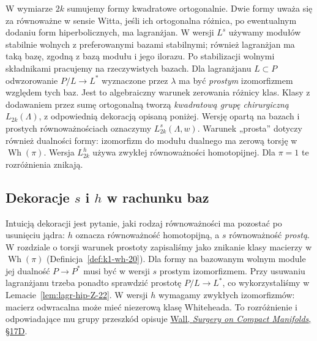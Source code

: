 W wymiarze $2k$ sumujemy formy kwadratowe
ortogonalnie. Dwie formy uważa się za równoważne
w sensie Witta, jeśli ich ortogonalna różnica,
po ewentualnym dodaniu form hiperbolicznych,
ma lagranżjan. W wersji $L^s$ używamy modułów
stabilnie wolnych z preferowanymi bazami stabilnymi;
również lagranżjan ma taką bazę, zgodną z bazą
modułu i jego ilorazu. Po stabilizacji wolnymi
składnikami pracujemy na rzeczywistych bazach.
Dla lagranżjanu
$L\subset P$ odwzorowanie $P/L\to L^*$
wyznaczone przez $\lambda$ ma być \emph{prostym}
izomorfizmem względem tych baz. Jest to algebraiczny warunek
zerowania różnicy klas. Klasy z dodawaniem
przez sumę ortogonalną tworzą \emph{kwadratową grupę
chirurgiczną} $L_{2k}(\Lambda)$, z odpowiednią
dekoracją opisaną poniżej. Wersję opartą na bazach
i prostych równoważnościach oznaczymy
$L^s_{2k}(\Lambda,w)$. Warunek „prosta” dotyczy
również dualności formy: izomorfizm do modułu dualnego
ma zerową torsję w $\operatorname{Wh}(\pi)$.
Wersja $L^h_{2k}$ używa zwykłej równoważności
homotopijnej. Dla $\pi=1$ te rozróżnienia znikają.

\subsection*{Dekoracje $s$ i $h$ w rachunku baz}
Intuicją dekoracji jest pytanie, jaki rodzaj
równoważności ma pozostać po usunięciu jądra:
$h$ oznacza równoważność homotopijną, a $s$
równoważność \emph{prostą}. W rozdziale o torsji
warunek prostoty zapisaliśmy jako znikanie klasy
macierzy w $\operatorname{Wh}(\pi)$
(Definicja~\ref{def:k1-wh-20}). Dla formy
na bazowanym wolnym module jej dualność
$P\to P^*$ musi być w wersji $s$ prostym
izomorfizmem. Przy usuwaniu lagranżjanu
trzeba ponadto sprawdzić prostotę
$P/L\to L^*$, co wykorzystaliśmy w
Lemacie~\ref{lem:lagr-hip-Z-22}.
W wersji $h$ wymagamy zwykłych izomorfizmów:
macierz odwracalna może mieć niezerową klasę
Whiteheada. To rozróżnienie i odpowiadające
mu grupy przeszkód opisuje
\href{https://webhomes.maths.ed.ac.uk/~v1ranick/books/scm.pdf}
{Wall, \emph{Surgery on Compact Manifolds}, §17D}.

